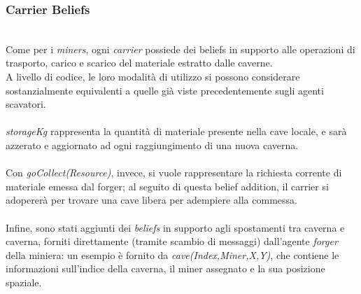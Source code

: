 \documentclass{llncs}
\begin{document}
\subsubsection{Carrier Beliefs}~
\\
Come per i \textit{miners}, ogni \textit{carrier} possiede dei beliefs in supporto alle operazioni di trasporto, carico e scarico del materiale estratto dalle caverne.\\A livello di codice, le loro modalità di utilizzo si possono considerare sostanzialmente equivalenti a quelle già viste precedentemente sugli agenti scavatori.\\\\
\textit{storageKg} rappresenta la quantità di materiale presente nella cave locale, e sarà azzerato e aggiornato ad ogni raggiungimento di una nuova caverna.\\\\
Con \textit{goCollect(Resource)}, invece, si vuole rappresentare la richiesta corrente di materiale emessa dal forger; al seguito di questa belief addition, il carrier si adopererà per trovare una cave libera per adempiere alla commessa.\\\\
Infine, sono stati aggiunti dei \textit{beliefs} in supporto agli spostamenti tra caverna e caverna, forniti direttamente (tramite scambio di messaggi) dall'agente \textit{forger} della miniera: un esempio è fornito da \textit{cave(Index,Miner,X,Y)}, che contiene le informazioni sull'indice della caverna, il miner assegnato e la sua posizione spaziale.\newpage
\end{document}
